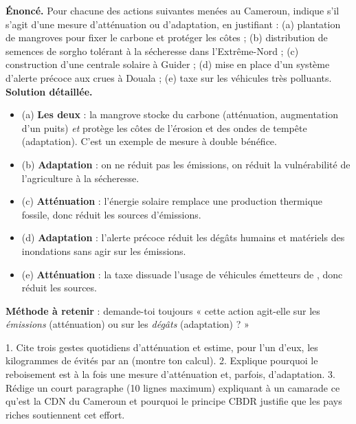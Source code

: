\documentclass[11pt]{article}
\begin{document}
\begin{exoresolu}
\textbf{Énoncé.} Pour chacune des actions suivantes menées au Cameroun, indique s'il s'agit d'une mesure d'atténuation ou d'adaptation, en justifiant : (a) plantation de mangroves pour fixer le carbone et protéger les côtes ; (b) distribution de semences de sorgho tolérant à la sécheresse dans l'Extrême-Nord ; (c) construction d'une centrale solaire à Guider ; (d) mise en place d'un système d'alerte précoce aux crues à Douala ; (e) taxe sur les véhicules très polluants.
\tcblower
\textbf{Solution détaillée.}
\begin{itemize}
\item (a) \textbf{Les deux} : la mangrove stocke du carbone (atténuation, augmentation d'un puits) \emph{et} protège les côtes de l'érosion et des ondes de tempête (adaptation). C'est un exemple de mesure à double bénéfice.
\item (b) \textbf{Adaptation} : on ne réduit pas les émissions, on réduit la vulnérabilité de l'agriculture à la sécheresse.
\item (c) \textbf{Atténuation} : l'énergie solaire remplace une production thermique fossile, donc réduit les sources d'émissions.
\item (d) \textbf{Adaptation} : l'alerte précoce réduit les dégâts humains et matériels des inondations sans agir sur les émissions.
\item (e) \textbf{Atténuation} : la taxe dissuade l'usage de véhicules émetteurs de , donc réduit les sources.
\end{itemize}
\textbf{Méthode à retenir} : demande-toi toujours « cette action agit-elle sur les \emph{émissions} (atténuation) ou sur les \emph{dégâts} (adaptation) ? »
\end{exoresolu}

\begin{exercice}
1. Cite trois gestes quotidiens d'atténuation et estime, pour l'un d'eux, les kilogrammes de  évités par an (montre ton calcul).
2. Explique pourquoi le reboisement est à la fois une mesure d'atténuation et, parfois, d'adaptation.
3. Rédige un court paragraphe (10 lignes maximum) expliquant à un camarade ce qu'est la CDN du Cameroun et pourquoi le principe CBDR justifie que les pays riches soutiennent cet effort.
\end{exercice}
\end{document}
